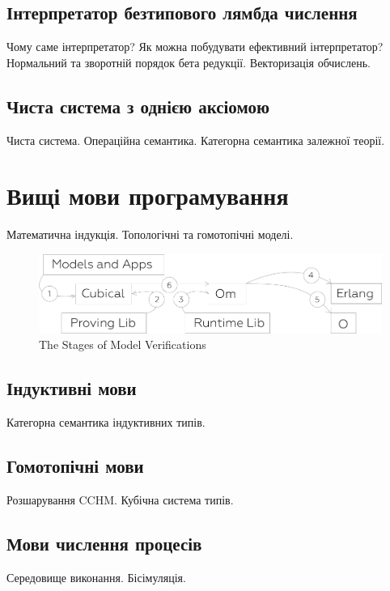 \documentclass{article}
\begin{document}
\subsection{Інтерпретатор безтипового лямбда числення}

Чому саме інтерпретатор?
Як можна побудувати ефективний інтерпретатор?
Нормальний та зворотній порядок бета редукції.
Векторизація обчислень.

\subsection{Чиста система з однією аксіомою}

Чиста система.
Операційна семантика.
Категорна семантика залежної теорії.

\section{Вищі мови програмування}

Математична індукція.
Топологічні та гомотопічні моделі.

\begin{figure}[h]
  \centerline{\includegraphics[scale=0.28]{higher}}
  \caption{The Stages of Model Verifications}
\end{figure}

\subsection{Індуктивні мови}

Категорна семантика індуктивних типів.

\subsection{Гомотопічні мови}

Розшарування CCHM.
Кубічна система типів.

\subsection{Мови числення процесів}

Середовище виконання.
Бісімуляція.
\end{document}
